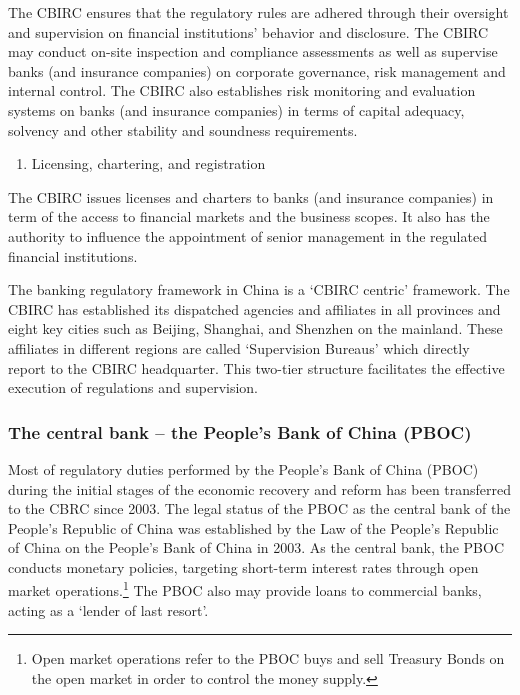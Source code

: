 \documentclass[
  letterpaper,
  DIV=11,
  numbers=noendperiod]{scrreprt}
\providecommand{\tightlist}{%
  \setlength{\itemsep}{0pt}\setlength{\parskip}{0pt}}\usepackage{longtable,booktabs,array}
\begin{document}
The CBIRC ensures that the regulatory rules are adhered through their
oversight and supervision on financial institutions' behavior and
disclosure. The CBIRC may conduct on-site inspection and compliance
assessments as well as supervise banks (and insurance companies) on
corporate governance, risk management and internal control. The CBIRC
also establishes risk monitoring and evaluation systems on banks (and
insurance companies) in terms of capital adequacy, solvency and other
stability and soundness requirements.

\begin{enumerate}
\def\labelenumi{\Roman{enumi})}
\setcounter{enumi}{2}
\tightlist
\item
  Licensing, chartering, and registration
\end{enumerate}

The CBIRC issues licenses and charters to banks (and insurance
companies) in term of the access to financial markets and the business
scopes. It also has the authority to influence the appointment of senior
management in the regulated financial institutions.

The banking regulatory framework in China is a `CBIRC centric'
framework. The CBIRC has established its dispatched agencies and
affiliates in all provinces and eight key cities such as Beijing,
Shanghai, and Shenzhen on the mainland. These affiliates in different
regions are called `Supervision Bureaus' which directly report to the
CBIRC headquarter. This two-tier structure facilitates the effective
execution of regulations and supervision.

\subsubsection{The central bank -- the People's Bank of China
(PBOC)}\label{the-central-bank-the-peoples-bank-of-china-pboc}

Most of regulatory duties performed by the People's Bank of China (PBOC)
during the initial stages of the economic recovery and reform has been
transferred to the CBRC since 2003. The legal status of the PBOC as the
central bank of the People's Republic of China was established by the
Law of the People's Republic of China on the People's Bank of China in
2003. As the central bank, the PBOC conducts monetary policies,
targeting short-term interest rates through open market
operations.\footnote{Open market operations refer to the PBOC buys and
  sell Treasury Bonds on the open market in order to control the money
  supply.} The PBOC also may provide loans to commercial banks, acting
as a `lender of last resort'.
\end{document}
